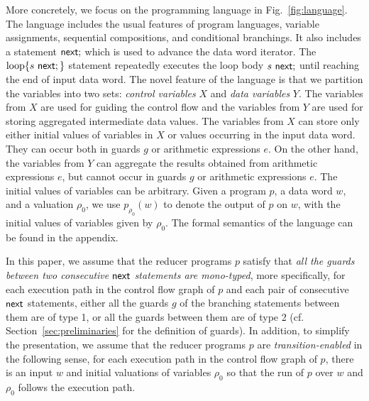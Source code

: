 More concretely, we focus on the programming language in Fig.~\ref{fig:language}. The language includes the usual features of program languages, variable assignments, sequential compositions, and conditional branchings. It also includes a statement $\mathsf{next};$ which is used to advance the data word iterator. The $\loopL{s\ \nnext;}$ statement repeatedly executes the loop body $s\ \mathsf{next};$ until reaching the end of input data word.
The novel feature of the language is that we partition the variables into two sets: \emph{control variables} $X$ and \emph{data variables} $Y$.
The variables from $X$ are used for guiding the control flow and the variables from $Y$ are used for storing aggregated intermediate data values.
The variables from $X$ can store only either initial values of variables in $X$ or values  occurring in the input data word. They can occur both in guards $g$ or arithmetic expressions $e$.
On the other hand, the variables from $Y$ can aggregate the results obtained from arithmetic expressions $e$, but cannot occur in guards $g$ or arithmetic expressions $e$. The initial values of variables can be arbitrary.
Given a program $p$, a data word $w$, and a valuation $\rho_0$, we use $p_{\rho_0}(w)$ to denote the output of $p$ on $w$, with the initial values of variables given by $\rho_0$. The formal semantics of the language can be found in the appendix. 

In this paper, we assume that the reducer programs $p$ satisfy that \emph{all the guards between two consecutive $\mathsf{next}$ statements are mono-typed}, more specifically,
for each execution path in the control flow graph of $p$ and each pair of consecutive $\mathsf{next}$ statements, either all the guards $g$ of the branching statements between them are of type 1, or all the guards between them are of type 2 (cf. Section~\ref{sec:preliminaries} for the definition of guards).
In addition, to simplify the presentation, we assume that the reducer programs $p$ are \emph{transition-enabled} in the following sense, 
%
for each execution path in the control flow graph of $p$, there is an input $w$ and initial valuations of variables $\rho_0$ so that the run of $p$ over $w$ and $\rho_0$ follows the execution path.


